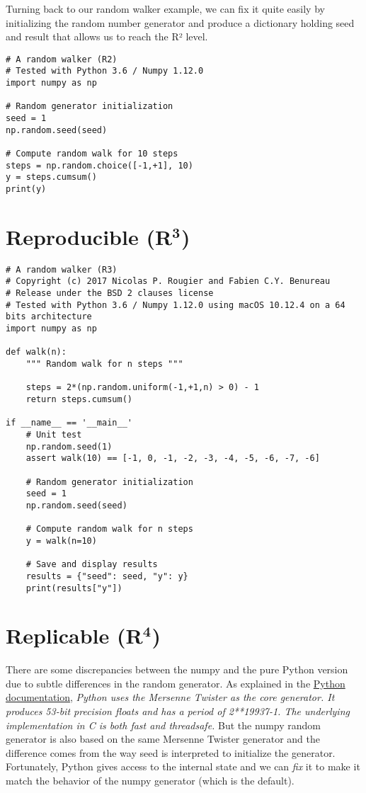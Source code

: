 \documentclass[a4paper,11pt]{article}
\begin{document}
Turning back to our random walker example, we can fix it quite easily by initializing the random number generator and produce a dictionary holding seed and result that allows us to reach the R² level.

\begin{lstlisting}
# A random walker (R2)
# Tested with Python 3.6 / Numpy 1.12.0
import numpy as np

# Random generator initialization
seed = 1
np.random.seed(seed)

# Compute random walk for 10 steps
steps = np.random.choice([-1,+1], 10)
y = steps.cumsum()
print(y)
\end{lstlisting}


\clearpage
\section*{Reproducible (R$^{\mathbf 3}$)}


\begin{lstlisting}
# A random walker (R3)
# Copyright (c) 2017 Nicolas P. Rougier and Fabien C.Y. Benureau
# Release under the BSD 2 clauses license
# Tested with Python 3.6 / Numpy 1.12.0 using macOS 10.12.4 on a 64 bits architecture
import numpy as np

def walk(n):
    """ Random walk for n steps """

    steps = 2*(np.random.uniform(-1,+1,n) > 0) - 1
    return steps.cumsum()

if __name__ == '__main__'
    # Unit test
    np.random.seed(1)
    assert walk(10) == [-1, 0, -1, -2, -3, -4, -5, -6, -7, -6]

    # Random generator initialization
    seed = 1
    np.random.seed(seed)
    
    # Compute random walk for n steps
    y = walk(n=10)

    # Save and display results
    results = {"seed": seed, "y": y}
    print(results["y"])
\end{lstlisting}


\clearpage
\section*{Replicable (R$^{\mathbf 4}$)}

There are some discrepancies between the numpy and the pure Python version due to subtle differences in the random generator.
As explained in the \href{https://docs.python.org/3.6/library/random.html}{Python documentation}, {\em Python uses the Mersenne Twister as the core generator. It produces 53-bit precision floats
and has a period of 2**19937-1.
The underlying implementation in C is both fast and threadsafe.}
But the numpy random generator is also based on the same Mersenne Twister generator and the difference comes from the way seed is interpreted to initialize the generator.
Fortunately, Python gives access to the internal state and we can {\em fix} it to make it match the behavior of the numpy generator (which is the default).
\end{document}
